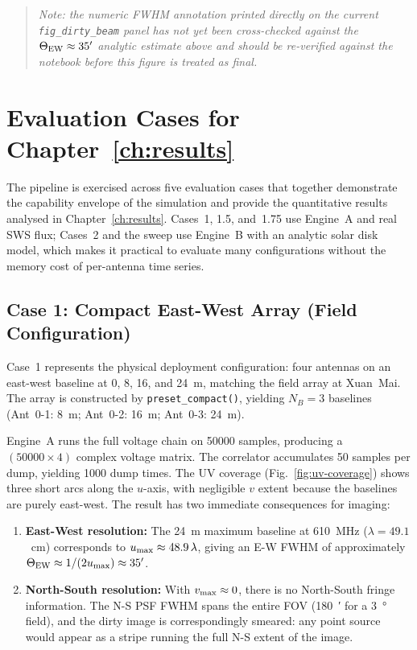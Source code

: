\begin{quote}\small\itshape
Note: the numeric FWHM annotation printed directly on the current
\texttt{fig\_dirty\_beam} panel has not yet been cross-checked against the
$\Theta_{\rm EW}\approx35'$ analytic estimate above and should be re-verified
against the notebook before this figure is treated as final.
\end{quote}

\section{Evaluation Cases for Chapter~\ref{ch:results}}
\label{sec:cases}

The pipeline is exercised across five evaluation cases that together
demonstrate the capability envelope of the simulation and provide the
quantitative results analysed in Chapter~\ref{ch:results}. Cases~1, 1.5,
and~1.75 use Engine~A and real SWS flux; Cases~2 and the sweep use Engine~B with an
analytic solar disk model, which makes it practical to evaluate many
configurations without the memory cost of per-antenna time series.

\subsection{Case 1: Compact East-West Array (Field Configuration)}
\label{subsec:case1}

Case~1 represents the physical deployment configuration: four antennas on an
east-west baseline at 0, 8, 16, and 24~m, matching the field array at
Xuan~Mai. The array is constructed by \texttt{preset\_compact()}, yielding
$N_B = 3$ baselines (Ant~0-1: 8~m; Ant~0-2: 16~m; Ant~0-3: 24~m).

Engine~A runs the full voltage chain on \num{50000} samples, producing a
$(50000\times 4)$ complex voltage matrix. The correlator accumulates 50 samples
per dump, yielding 1000 dump times. The UV coverage (Fig.~\ref{fig:uv-coverage})
shows three short arcs along the $u$-axis, with negligible $v$ extent because
the baselines are purely east-west. The result has two immediate consequences
for imaging:

\begin{enumerate}[leftmargin=*]
  \item \textbf{East-West resolution:} The 24~m maximum baseline at
  \SI{610}{\mega\hertz} ($\lambda = 49.1$~cm) corresponds to $u_{\rm max}
  \approx 48.9\,\lambda$, giving an E-W FWHM of approximately
  $\Theta_{\rm EW} \approx 1/(2u_{\rm max}) \approx 35'$.

  \item \textbf{North-South resolution:} With $v_{\rm max} \approx 0$, there
  is no North-South fringe information. The N-S PSF FWHM spans the entire FOV
  (\SI{180}{\arcminute} for a \SI{3}{\degree} field), and the dirty image is
  correspondingly smeared: any point source would appear as a stripe running the
  full N-S extent of the image.
\end{enumerate}

